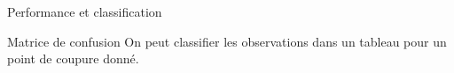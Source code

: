\documentclass[
  ignorenonframetext,
]{beamer}
\newenvironment{Shaded}{\begin{snugshade}}{\end{snugshade}}
\newcommand{\AttributeTok}[1]{\textcolor[rgb]{0.40,0.45,0.13}{#1}}
\newcommand{\CommentTok}[1]{\textcolor[rgb]{0.37,0.37,0.37}{#1}}
\newcommand{\FunctionTok}[1]{\textcolor[rgb]{0.28,0.35,0.67}{#1}}
\newcommand{\NormalTok}[1]{\textcolor[rgb]{0.00,0.23,0.31}{#1}}
\newcommand{\OtherTok}[1]{\textcolor[rgb]{0.00,0.23,0.31}{#1}}
\newcommand{\SpecialCharTok}[1]{\textcolor[rgb]{0.37,0.37,0.37}{#1}}
\begin{document}
\begin{frame}[fragile]{Performance et classification}
\label{performance-et-classification}
\begin{Shaded}
\end{Shaded}
\end{frame}

\begin{frame}{Matrice de confusion}
\label{matrice-de-confusion}
On peut classifier les observations dans un tableau pour un point de
coupure donné.

\begin{table}

\caption{\label{tbl-confumat}Matrice de confusion avec point de coupure
optimal. Les entrées donnent le décompte du nombre d'observation par
combinaison \((Y, \widehat{Y})\)}


\end{table}%
\end{frame}
\end{document}
